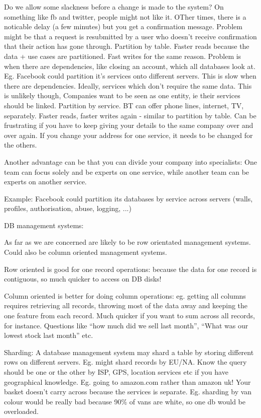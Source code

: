 \documentclass[11pt]{article}
\begin{document}
Do we allow some slackness before a change is made to the system? On something like fb and twitter, people might not like it. OTher times, there is a noticable delay (a few minutes) but you get a confirmation message. Problem might be that a request is resubmitted by a user who doesn’t receive confirmation that their action has gone through.
Partition by table. Faster reads because the data + use cases are partitioned. Fast writes for the same reason. Problem is when there are dependencies, like closing an account, which all databases look at. Eg. Facebook could partition it’s services onto different servers. This is slow when there are dependencies. Ideally, services which don’t require the same data. This is unlikely though, Companies want to be seen as one entity, ie their services should be linked.
Partition by service. BT can offer phone lines, internet, TV, separately. Faster reads, faster writes again - similar to partition by table. Can be frustrating if you have to keep giving your details to the same company over and over again. If you change your address for one service, it needs to be changed for the others. 

Another advantage can be that you can divide your company into specialists: One team can focus solely and be experts on one service, while another team can be experts on another service.

Example: Facebook could partition its databases by service across servers (walls, profiles, authorisation, abuse, logging, ...)

DB management systems:

As far as we are concerned are likely to be row orientated management systems. Could also be column oriented management systems.

Row oriented is good for one record operations: because the data for one record is contiguous, so much quicker to access on DB disks!

Column oriented is better for doing column operations: eg. getting all columns requires retrieving all records, throwing most of the data away and keeping the one feature from each record. Much quicker if you want to sum across all records, for instance. Questions like “how much did we sell last month”, “What was our lowest stock last month” etc.

Sharding: A database management system may shard a table by storing different rows on different servers. Eg. might shard records by EU/NA. Know the query should be one or the other by ISP, GPS, location services etc if you have geographical knowledge. Eg. going to amazon.com rather than amazon uk! Your basket doesn’t carry across because the services is separate. Eg. sharding by van colour would be really bad because 90\% of vans are white, so one db would be overloaded.
\end{document}
